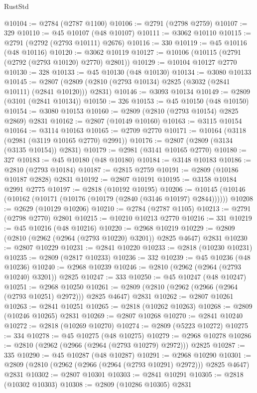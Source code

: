\begin{lexlean}{RustStd}
\begin{coremodule}
@10104 := @2784 (@2787 @1100)
@10106 := @2791 (@2798 @2759)
@10107 := 329
@10110 := @45 @10107 (@48 @10107)
@10111 := @3062 @10110
@10115 := @2791 (@2792 (@2793 @10111) @2676)
@10116 := 330
@10119 := @45 @10116 (@48 @10116)
@10120 := @3062 @10119
@10127 := @10106 (@10115 (@2791 (@2792 (@2793 @10120) @2770) @2801))
@10129 := @10104 @10127 @2770
@10130 := 328
@10133 := @45 @10130 (@48 @10130)
@10134 := @3080 @10133
@10145 := @2807 (@2809 (@2810 (@2793 @10134) @2825 (@3032 (@2841 @10111) (@2841 @10120))) @2831)
@10146 := @3093 @10134
@10149 := @2809 (@3101 (@2841 @10134))
@10150 := 326
@10153 := @45 @10150 (@48 @10150)
@10154 := @3080 @10153
@10160 := @2809 (@2810 (@2793 @10154) @2825 @2869) @2831
@10162 := @2807 (@10149 @10160)
@10163 := @3115 @10154
@10164 := @3114 @10163
@10165 := @2709 @2770
@10171 := @10164 (@3118 (@2981 (@3119 @10165 @2770) @2991))
@10176 := @2807 (@2809 (@3134 (@3135 @10154)) @2831)
@10179 := @2981 (@3141 @10165 @2770)
@10180 := 327
@10183 := @45 @10180 (@48 @10180)
@10184 := @3148 @10183
@10186 := @2810 (@2793 @10184)
@10187 := @2815 @2759
@10191 := @2809 (@10186 @10187 @2828) @2831
@10192 := @2807 @10191
@10195 := @3158 @10184 @2991 @2775
@10197 := @2818 (@10192 @10195)
@10206 := @10145 (@10146 (@10162 (@10171 (@10176 (@10179 (@2840 (@3146 @10197) @2844))))))
@10208 := @2629 (@10129 @10206)
@10210 := @2784 (@2787 @1105)
@10213 := @2791 (@2798 @2770) @2801
@10215 := @10210 @10213 @2770
@10216 := 331
@10219 := @45 @10216 (@48 @10216)
@10220 := @2968 @10219
@10229 := @2809 (@2810 (@2962 (@2964 (@2793 @10220) @3201)) @2825 @4647) @2831
@10230 := @2807 @10229
@10231 := @2841 @10220
@10233 := @2818 (@10230 @10231)
@10235 := @2809 (@2817 @10233)
@10236 := 332
@10239 := @45 @10236 (@48 @10236)
@10240 := @2968 @10239
@10246 := @2810 (@2962 (@2964 (@2793 @10240) @3201)) @2825
@10247 := 333
@10250 := @45 @10247 (@48 @10247)
@10251 := @2968 @10250
@10261 := @2809 (@2810 (@2962 (@2966 (@2964 (@2793 @10251) @2972))) @2825 @4647) @2831
@10262 := @2807 @10261
@10263 := @2841 @10251
@10265 := @2818 (@10262 @10263)
@10268 := @2809 (@10246 @10265) @2831
@10269 := @2807 @10268
@10270 := @2841 @10240
@10272 := @2818 (@10269 @10270)
@10274 := @2809 (@5223 @10272)
@10275 := 334
@10278 := @45 @10275 (@48 @10275)
@10279 := @2968 @10278
@10286 := @2810 (@2962 (@2966 (@2964 (@2793 @10279) @2972))) @2825
@10287 := 335
@10290 := @45 @10287 (@48 @10287)
@10291 := @2968 @10290
@10301 := @2809 (@2810 (@2962 (@2966 (@2964 (@2793 @10291) @2972))) @2825 @4647) @2831
@10302 := @2807 @10301
@10303 := @2841 @10291
@10305 := @2818 (@10302 @10303)
@10308 := @2809 (@10286 @10305) @2831

\end{coremodule}
\end{lexlean}
